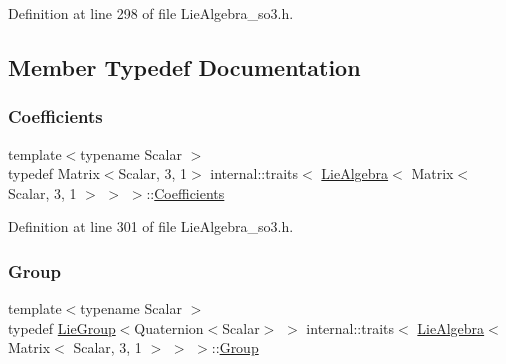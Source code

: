 Definition at line 298 of file Lie\+Algebra\+\_\+so3.\+h.



\subsection{Member Typedef Documentation}
\hypertarget{structinternal_1_1traits_3_01_lie_algebra_3_01_matrix_3_01_scalar_00_013_00_011_01_4_01_4_01_4_a8ef1db6f76e3e2ca5f0aff3609d06f7c}{}\label{structinternal_1_1traits_3_01_lie_algebra_3_01_matrix_3_01_scalar_00_013_00_011_01_4_01_4_01_4_a8ef1db6f76e3e2ca5f0aff3609d06f7c} 
\subsubsection{\texorpdfstring{Coefficients}{Coefficients}}
{\footnotesize\ttfamily template$<$typename Scalar $>$ \\
typedef Matrix$<$Scalar, 3, 1$>$ internal\+::traits$<$ \hyperlink{class_lie_algebra}{Lie\+Algebra}$<$ Matrix$<$ Scalar, 3, 1 $>$ $>$ $>$\+::\hyperlink{structinternal_1_1traits_3_01_lie_algebra_3_01_matrix_3_01_scalar_00_013_00_011_01_4_01_4_01_4_a8ef1db6f76e3e2ca5f0aff3609d06f7c}{Coefficients}}



Definition at line 301 of file Lie\+Algebra\+\_\+so3.\+h.

\hypertarget{structinternal_1_1traits_3_01_lie_algebra_3_01_matrix_3_01_scalar_00_013_00_011_01_4_01_4_01_4_a55e3fb1ea655ef4f7582a54857fe98b1}{}\label{structinternal_1_1traits_3_01_lie_algebra_3_01_matrix_3_01_scalar_00_013_00_011_01_4_01_4_01_4_a55e3fb1ea655ef4f7582a54857fe98b1} 
\subsubsection{\texorpdfstring{Group}{Group}}
{\footnotesize\ttfamily template$<$typename Scalar $>$ \\
typedef \hyperlink{class_lie_group}{Lie\+Group}$<$Quaternion$<$Scalar$>$ $>$ internal\+::traits$<$ \hyperlink{class_lie_algebra}{Lie\+Algebra}$<$ Matrix$<$ Scalar, 3, 1 $>$ $>$ $>$\+::\hyperlink{structinternal_1_1traits_3_01_lie_algebra_3_01_matrix_3_01_scalar_00_013_00_011_01_4_01_4_01_4_a55e3fb1ea655ef4f7582a54857fe98b1}{Group}}



